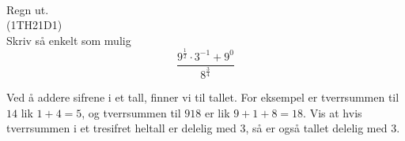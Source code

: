  \\[12pt]


\newpage
{}
Regn ut.\os
{} \\[10pt]
\newpage
{} 
(1TH21D1) \\%
Skriv så enkelt som mulig
\[ \frac{9^{\frac{1}{2}}\cdot 3^{-1}+9^0}{8^{\frac{3}{4}}} \]

Ved å addere sifrene i et tall, finner vi  til tallet. For eksempel er tverrsummen til $ 14 $ lik $ 1+4=5 $, og tverrsummen til $ 918 $ er lik $ 9+1+8=18 $. Vis at hvis tverrsummen i et tresifret heltall er delelig med 3, så er også tallet delelig med 3.\vsk




